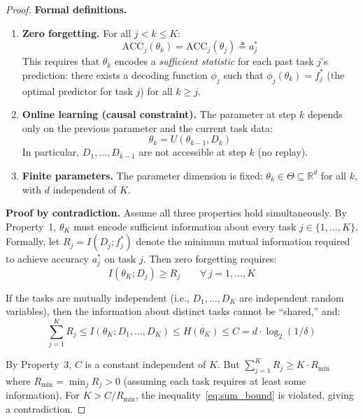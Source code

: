 \documentclass{article}
\begin{document}
\begin{proof}
\textbf{Formal definitions.}

\begin{enumerate}
    \item \textbf{Zero forgetting.} For all $j < k \leq K$:
    \begin{equation}
        \mathrm{ACC}_j(\theta_k) = \mathrm{ACC}_j(\theta_j) \triangleq a_j^*
    \end{equation}
    This requires that $\theta_k$ encodes a \emph{sufficient statistic} for each past task $j$'s prediction: there exists a decoding function $\phi_j$ such that $\phi_j(\theta_k) = f_j^*$ (the optimal predictor for task $j$) for all $k \geq j$.

    \item \textbf{Online learning (causal constraint).} The parameter at step $k$ depends only on the previous parameter and the current task data:
    \begin{equation}
        \theta_k = U(\theta_{k-1}, D_k)
    \end{equation}
    In particular, $D_1, \ldots, D_{k-1}$ are not accessible at step $k$ (no replay).

    \item \textbf{Finite parameters.} The parameter dimension is fixed: $\theta_k \in \Theta \subseteq \mathbb{R}^d$ for all $k$, with $d$ independent of $K$.
\end{enumerate}

\textbf{Proof by contradiction.}
Assume all three properties hold simultaneously. By Property~1, $\theta_K$ must encode sufficient information about every task $j \in \{1, \ldots, K\}$. Formally, let $R_j = I(D_j; f_j^*)$ denote the minimum mutual information required to achieve accuracy $a_j^*$ on task $j$. Then zero forgetting requires:
\begin{equation}
    I(\theta_K; D_j) \geq R_j \qquad \forall \, j = 1, \ldots, K
\end{equation}

If the tasks are mutually independent (i.e., $D_1, \ldots, D_K$ are independent random variables), then the information about distinct tasks cannot be ``shared,'' and:
\begin{equation}
    \label{eq:sum_bound}
    \sum_{j=1}^{K} R_j \leq I\left(\theta_K; D_1, \ldots, D_K\right) \leq H(\theta_K) \leq C = d \cdot \log_2(1/\delta)
\end{equation}

By Property~3, $C$ is a constant independent of $K$. But $\sum_{j=1}^K R_j \geq K \cdot R_{\min}$ where $R_{\min} = \min_j R_j > 0$ (assuming each task requires at least some information). For $K > C / R_{\min}$, the inequality~\eqref{eq:sum_bound} is violated, giving a contradiction.


\end{proof}
\end{document}
